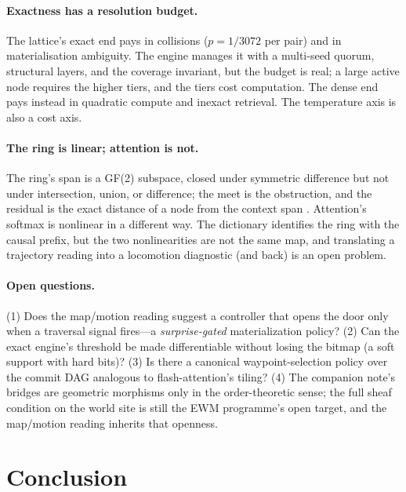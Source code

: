 \documentclass[11pt,a4paper]{article}
\theoremstyle{remark}
\begin{document}
\paragraph{Exactness has a resolution budget.} The lattice's exact end pays in
collisions ($p=1/3072$ per pair) and in materialisation ambiguity. The engine
manages it with a multi-seed quorum, structural layers, and the coverage
invariant, but the budget is real; a large active node requires the higher
tiers, and the tiers cost computation. The dense end pays instead in quadratic
compute and inexact retrieval. The temperature axis is also a cost axis.

\paragraph{The ring is linear; attention is not.} The ring's span is a GF(2)
subspace, closed under symmetric difference but not under intersection, union,
or difference; the meet is the obstruction, and the residual is the exact
distance of a node from the context span \cite{state2026}. Attention's softmax
is nonlinear in a different way. The dictionary identifies the ring with the
causal prefix, but the two nonlinearities are not the same map, and translating
a trajectory reading into a locomotion diagnostic (and back) is an open
problem.

\paragraph{Open questions.} (1) Does the map/motion reading suggest a
controller that opens the door only when a traversal signal fires---a
\emph{surprise-gated} materialization policy? (2) Can the exact engine's
threshold be made differentiable without losing the bitmap (a soft support with
hard bits)? (3) Is there a canonical waypoint-selection policy over the commit
DAG analogous to flash-attention's tiling? (4) The companion note's bridges are
geometric morphisms only in the order-theoretic sense; the full sheaf condition
on the world site is still the EWM programme's open target, and the map/motion
reading inherits that openness.

\section{Conclusion}
\label{sec:conclusion}
\end{document}
